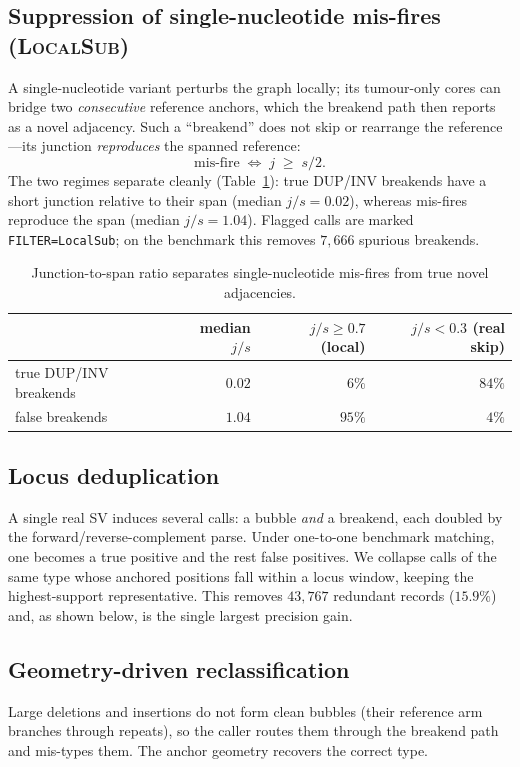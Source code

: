 \documentclass[11pt]{article}
\begin{document}
\subsection{Suppression of single-nucleotide mis-fires (\textsc{LocalSub})}
\label{sec:localsub}
A single-nucleotide variant perturbs the graph locally; its tumour-only cores can bridge two
\emph{consecutive} reference anchors, which the breakend path then reports as a novel adjacency.
Such a ``breakend'' does not skip or rearrange the reference---its junction \emph{reproduces} the
spanned reference:
\begin{equation}
\text{mis-fire} \;\iff\; j \;\geq\; s/2 .
\end{equation}
The two regimes separate cleanly (Table~\ref{tab:ratio}): true DUP/INV breakends have a short
junction relative to their span (median $j/s = 0.02$), whereas mis-fires reproduce the span
(median $j/s = 1.04$). Flagged calls are marked \texttt{FILTER=LocalSub}; on the benchmark this
removes $7{,}666$ spurious breakends.

\begin{table}[t]
\centering
\begin{tabular}{lrrr}
\toprule
& median $j/s$ & $j/s \ge 0.7$ (local) & $j/s < 0.3$ (real skip) \\
\midrule
true DUP/INV breakends & $0.02$ & $6\%$ & $84\%$ \\
false breakends        & $1.04$ & $95\%$ & $4\%$ \\
\bottomrule
\end{tabular}
\caption{Junction-to-span ratio separates single-nucleotide mis-fires from true novel
adjacencies.}
\label{tab:ratio}
\end{table}

\subsection{Locus deduplication}
A single real SV induces several calls: a bubble \emph{and} a breakend, each doubled by the
forward/reverse-complement parse. Under one-to-one benchmark matching, one becomes a true positive
and the rest false positives. We collapse calls of the same type whose anchored positions fall
within a locus window, keeping the highest-support representative. This removes $43{,}767$
redundant records ($15.9\%$) and, as shown below, is the single largest precision gain.

\subsection{Geometry-driven reclassification}
Large deletions and insertions do not form clean bubbles (their reference arm branches through
repeats), so the caller routes them through the breakend path and mis-types them. The anchor
geometry recovers the correct type.
\end{document}
